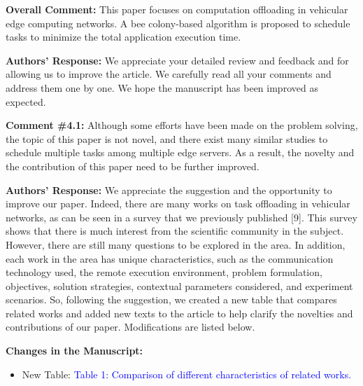 \begin{center}
\end{center}

\vspace{0.5cm}

\begin{mdframed}[style=review] 
\textbf{Overall Comment:} This paper focuses on computation offloading in vehicular edge computing networks. A bee colony-based algorithm is proposed to schedule tasks to minimize the total application execution time.
\end{mdframed}

\textbf{Authors' Response:} We appreciate your detailed review and feedback and for allowing us to improve the article. We carefully read all your comments and address them one by one. We hope the manuscript has been improved as expected.
\\

\begin{mdframed}[style=review] 
\textbf{Comment \#4.1:} Although some efforts have been made on the problem solving, the topic of this paper is not novel, and there exist many similar studies to schedule multiple tasks among multiple edge servers. As a result, the novelty and the contribution of this paper need to be further improved.
\end{mdframed}

\textbf{Authors' Response:} We appreciate the suggestion and the opportunity to improve our paper. Indeed, there are many works on task offloading in vehicular networks, as can be seen in a survey that we previously published [9]. This survey shows that there is much interest from the scientific community in the subject. However, there are still many questions to be explored in the area. In addition, each work in the area has unique characteristics, such as the communication technology used, the remote execution environment, problem formulation, objectives, solution strategies, contextual parameters considered, and experiment scenarios. So, following the suggestion, we created a new table that compares related works and added new texts to the article to help clarify the novelties and contributions of our paper. Modifications are listed below.

\textbf{Changes in the Manuscript:}

\begin{itemize}
    \item New Table: \textcolor{blue}{Table 1: Comparison of different characteristics of related works.}
\end{itemize}

